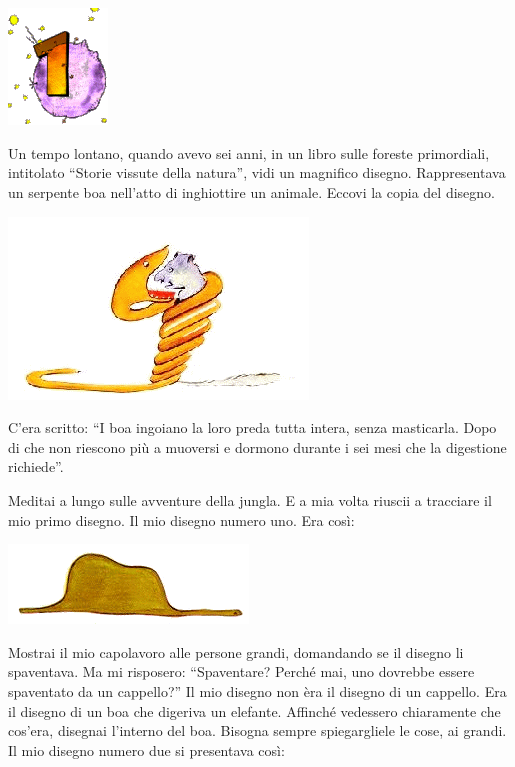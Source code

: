 \documentclass[11pt]{scrbook}
\begin{document}
\chapter{}
\begin{center}
\includegraphics{./img/chapter1.png}
\end{center}

Un tempo lontano, quando avevo sei anni, in un libro sulle foreste
primordiali, intitolato ``Storie vissute della natura'', vidi un
magnifico disegno. Rappresentava un serpente boa nell'atto di
inghiottire un animale. Eccovi la copia del disegno.

\begin{center}
\includegraphics{./img/1a.png}
\end{center}

C'era scritto: ``I boa ingoiano la loro preda tutta intera, senza
masticarla. Dopo di che non riescono più a muoversi e dormono durante i
sei mesi che la digestione richiede''.

Meditai a lungo sulle avventure della jungla. E a mia volta riuscii a
tracciare il mio primo disegno. Il mio disegno numero uno. Era così:

\begin{center}
\includegraphics{./img/sombrero.png}
\end{center}

Mostrai il mio capolavoro alle persone grandi, domandando se il disegno
li spaventava. Ma mi risposero: ``Spaventare? Perché mai, uno dovrebbe
essere spaventato da un cappello?'' Il mio disegno non èra il disegno di
un cappello. Era il disegno di un boa che digeriva un elefante. Affinché
vedessero chiaramente che cos'era, disegnai l'interno del boa. Bisogna
sempre spiegargliele le cose, ai grandi. Il mio disegno numero due si
presentava così:
\end{document}
